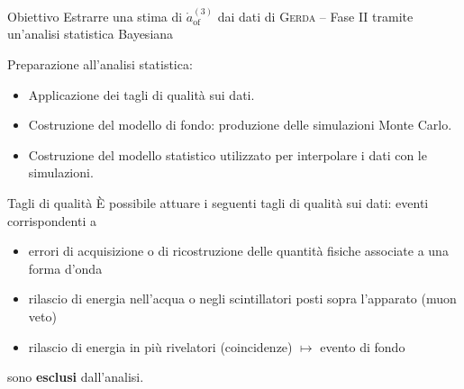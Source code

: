 \documentclass[10pt]{beamer}
\newcommand{\aof}{\mathring{a}_\text{of}^{(3)}}
\newcommand{\gerda}{\textsc{Gerda}}
\begin{document}
\begin{frame}[label=7]
	\begin{alertblock}{Obiettivo}
		Estrarre una stima di $\aof$ dai dati di {\gerda} -- Fase II tramite un'analisi statistica Bayesiana
	\end{alertblock}
	Preparazione all'analisi statistica:
	\begin{itemize}
		\item Applicazione dei \alert{tagli di qualità} sui dati.
		\item Costruzione del \alert{modello di fondo}: produzione delle simulazioni Monte Carlo.
		\item Costruzione del \alert{modello statistico} utilizzato per interpolare i dati con le simulazioni.
	\end{itemize}
\end{frame}
\begin{frame}[label=8]{Tagli di qualità}
	È possibile attuare i seguenti tagli di qualità sui dati: eventi corrispondenti a
	\begin{itemize}
		\item \alert{errori di acquisizione o di ricostruzione} delle quantità fisiche associate a una forma d'onda
		\item rilascio di energia nell'acqua o negli scintillatori posti sopra l'apparato (\alert{muon veto})
		\item rilascio di energia in più rivelatori (\alert{coincidenze}) $\longmapsto$ evento di fondo
	\end{itemize}
	sono \textbf{esclusi} dall'analisi.
\end{frame}
\end{document}
